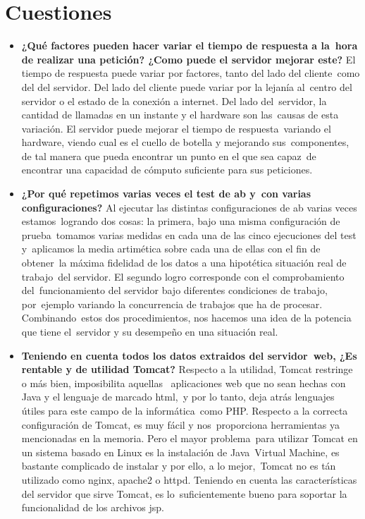 \documentclass[11pt,twoside,a4paper]{book}
\renewcommand{\baselinestretch}{1.2}
\begin{document}
\section{Cuestiones}
\begin{itemize}
  \item \textbf{¿Qué factores pueden hacer variar el tiempo de respuesta a la\
   hora de realizar una petición? ¿Como puede el servidor mejorar este?}\newline
   El tiempo de respuesta puede variar por factores, tanto del lado del cliente\
   como del del servidor. Del lado del cliente puede variar por la lejanía al\
   centro del servidor o el estado de la conexión a internet. Del lado del\
   servidor, la cantidad de llamadas en un instante y el hardware son las\
   causas de esta variación. El servidor puede mejorar el tiempo de respuesta\
   variando el hardware, viendo cual es el cuello de botella y mejorando sus\
   componentes, de tal manera que pueda encontrar un punto en el que sea capaz\
   de encontrar una capacidad de cómputo suficiente para sus peticiones.

  \item \textbf{¿Por qué repetimos varias veces el test de ab y\
   con varias configuraciones?}\newline
   Al ejecutar las distintas configuraciones de ab varias veces estamos\
   logrando dos cosas: la primera, bajo una misma configuración de prueba\
   tomamos varias medidas en cada una de las cinco ejecuciones del test y\
   aplicamos la media artimética sobre cada una de ellas con el fin de obtener\
   la máxima fidelidad de los datos a una hipotética situación real de trabajo\
   del servidor. El segundo logro corresponde con el comprobamiento del\
   funcionamiento del servidor bajo diferentes condiciones de trabajo, por\
   ejemplo variando la concurrencia de trabajos que ha de procesar. Combinando\
   estos dos procedimientos, nos hacemos una idea de la potencia que tiene el\
   servidor y su desempeño en una situación real.

  \item \textbf{Teniendo en cuenta todos los datos extraidos del servidor\
   web, ¿Es rentable y de utilidad Tomcat?}\newline
   Respecto a la utilidad, Tomcat restringe o más bien, imposibilita aquellas \
   aplicaciones web que no sean hechas con Java y el lenguaje de marcado html,\
   y por lo tanto, deja atrás lenguajes útiles para este campo de la informática\
   como PHP. Respecto a la correcta configuración de Tomcat, es muy fácil y nos\
   proporciona herramientas ya mencionadas en la memoria. Pero el mayor problema\
   para utilizar Tomcat en un sistema basado en Linux es la instalación de Java\
   Virtual Machine, es bastante complicado de instalar y por ello, a lo mejor,\
   Tomcat no es tán utilizado como nginx, apache2 o httpd.
   Teniendo en cuenta las características del servidor que sirve Tomcat, es lo\
   suficientemente bueno para soportar la funcionalidad de los archivos jsp.

\end{itemize}


\renewcommand{\baselinestretch}{1.2}



\nocite{*}
\end{document}
